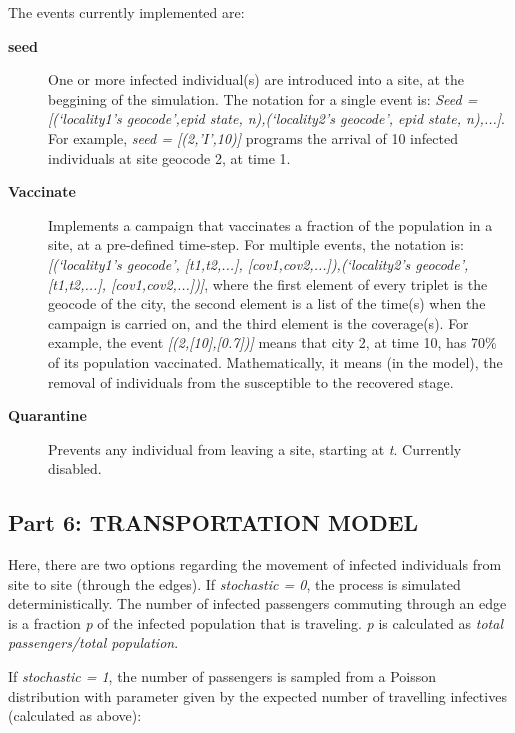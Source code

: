 \documentclass[a4paper,10pt,english]{sphinxmanual}
\begin{document}
The events currently implemented are:
\begin{description}
\item[{\textbf{seed}}] \leavevmode
One or more infected individual(s) are introduced into a site, at the beggining of the simulation. The notation for a single event is: \emph{Seed = {[}(`locality1's geocode',epid state, n),(`locality2's geocode', epid state, n),...{]}}. For example, \emph{seed = {[}(2,'I',10){]}} programs the arrival of 10 infected individuals at site geocode 2, at time 1.

\item[{\textbf{Vaccinate}}] \leavevmode
Implements a campaign that vaccinates a fraction of the population in a site, at a pre-defined time-step. For multiple events, the notation is: \emph{{[}(`locality1's geocode', {[}t1,t2,...{]}, {[}cov1,cov2,...{]}),(`locality2's geocode', {[}t1,t2,...{]}, {[}cov1,cov2,...{]}){]}}, where the first element of every triplet is the geocode of the city, the second element is a list of the time(s) when the campaign is carried on, and the third element is the coverage(s). For example, the event \emph{{[}(2,{[}10{]},{[}0.7{]}){]}} means that city 2, at time 10, has 70\% of its population vaccinated. Mathematically, it means (in the model), the removal of individuals from the susceptible to the recovered stage.

\item[{\textbf{Quarantine}}] \leavevmode
Prevents any individual from leaving a site, starting at \emph{t}. Currently disabled.

\end{description}


\subsection{Part 6: TRANSPORTATION MODEL}
\label{using:part-6-transportation-model}
Here, there are two options regarding the movement of infected individuals from site to site (through the edges). If \emph{stochastic = 0}, the process is simulated deterministically. The number of infected passengers commuting through an edge is a fraction \emph{p} of the infected population that is traveling. \emph{p} is calculated as \emph{total passengers/total population}.

If \emph{stochastic = 1}, the number of passengers is sampled from a Poisson distribution with parameter given by the expected number of travelling infectives (calculated as above):
\end{document}
